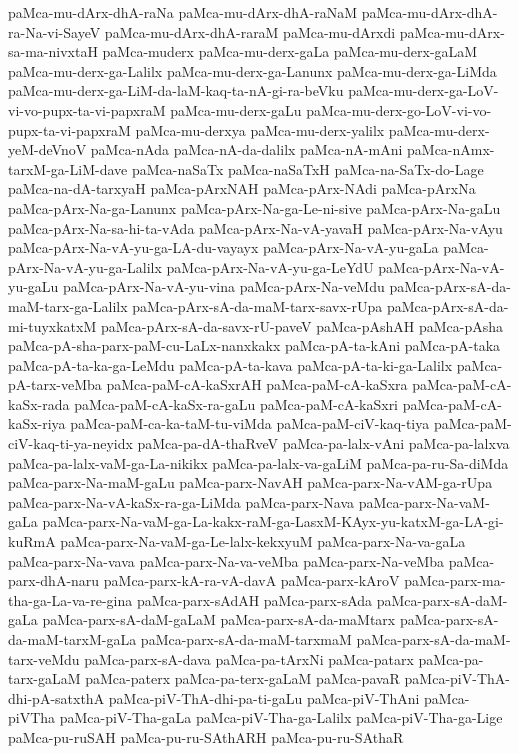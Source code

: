 {paMca-mu-dArx-dhA-raNa
paMca-mu-dArx-dhA-raNaM
paMca-mu-dArx-dhA-ra-Na-vi-SayeV
paMca-mu-dArx-dhA-raraM
paMca-mu-dArxdi
paMca-mu-dArx-sa-ma-nivxtaH
paMca-muderx
paMca-mu-derx-gaLa
paMca-mu-derx-gaLaM
paMca-mu-derx-ga-Lalilx
paMca-mu-derx-ga-Lanunx
paMca-mu-derx-ga-LiMda
paMca-mu-derx-ga-LiM-da-laM-kaq-ta-nA-gi-ra-beVku
paMca-mu-derx-ga-LoV-vi-vo-pupx-ta-vi-papxraM
paMca-mu-derx-gaLu
paMca-mu-derx-go-LoV-vi-vo-pupx-ta-vi-papxraM
paMca-mu-derxya
paMca-mu-derx-yalilx
paMca-mu-derx-yeM-deVnoV
paMca-nAda
paMca-nA-da-dalilx
paMca-nA-mAni
paMca-nAmx-tarxM-ga-LiM-dave
paMca-naSaTx
paMca-naSaTxH
paMca-na-SaTx-do-Lage
paMca-na-dA-tarxyaH
paMca-pArxNAH
paMca-pArx-NAdi
paMca-pArxNa
paMca-pArx-Na-ga-Lanunx
paMca-pArx-Na-ga-Le-ni-sive
paMca-pArx-Na-gaLu
paMca-pArx-Na-sa-hi-ta-vAda
paMca-pArx-Na-vA-yavaH
paMca-pArx-Na-vAyu
paMca-pArx-Na-vA-yu-ga-LA-du-vayayx
paMca-pArx-Na-vA-yu-gaLa
paMca-pArx-Na-vA-yu-ga-Lalilx
paMca-pArx-Na-vA-yu-ga-LeYdU
paMca-pArx-Na-vA-yu-gaLu
paMca-pArx-Na-vA-yu-vina
paMca-pArx-Na-veMdu
paMca-pArx-sA-da-maM-tarx-ga-Lalilx
paMca-pArx-sA-da-maM-tarx-savx-rUpa
paMca-pArx-sA-da-mi-tuyxkatxM
paMca-pArx-sA-da-savx-rU-paveV
paMca-pAshAH
paMca-pAsha
paMca-pA-sha-parx-paM-cu-LaLx-nanxkakx
paMca-pA-ta-kAni
paMca-pA-taka
paMca-pA-ta-ka-ga-LeMdu
paMca-pA-ta-kava
paMca-pA-ta-ki-ga-Lalilx
paMca-pA-tarx-veMba
paMca-paM-cA-kaSxrAH
paMca-paM-cA-kaSxra
paMca-paM-cA-kaSx-rada
paMca-paM-cA-kaSx-ra-gaLu
paMca-paM-cA-kaSxri
paMca-paM-cA-kaSx-riya
paMca-paM-ca-ka-taM-tu-viMda
paMca-paM-ciV-kaq-tiya
paMca-paM-ciV-kaq-ti-ya-neyidx
paMca-pa-dA-thaRveV
paMca-pa-lalx-vAni
paMca-pa-lalxva
paMca-pa-lalx-vaM-ga-La-nikikx
paMca-pa-lalx-va-gaLiM
paMca-pa-ru-Sa-diMda
paMca-parx-Na-maM-gaLu
paMca-parx-NavAH
paMca-parx-Na-vAM-ga-rUpa
paMca-parx-Na-vA-kaSx-ra-ga-LiMda
paMca-parx-Nava
paMca-parx-Na-vaM-gaLa
paMca-parx-Na-vaM-ga-La-kakx-raM-ga-LasxM-KAyx-yu-katxM-ga-LA-gi-kuRmA
paMca-parx-Na-vaM-ga-Le-lalx-kekxyuM
paMca-parx-Na-va-gaLa
paMca-parx-Na-vava
paMca-parx-Na-va-veMba
paMca-parx-Na-veMba
paMca-parx-dhA-naru
paMca-parx-kA-ra-vA-davA
paMca-parx-kAroV
paMca-parx-ma-tha-ga-La-va-re-gina
paMca-parx-sAdAH
paMca-parx-sAda
paMca-parx-sA-daM-gaLa
paMca-parx-sA-daM-gaLaM
paMca-parx-sA-da-maMtarx
paMca-parx-sA-da-maM-tarxM-gaLa
paMca-parx-sA-da-maM-tarxmaM
paMca-parx-sA-da-maM-tarx-veMdu
paMca-parx-sA-dava
paMca-pa-tArxNi
paMca-patarx
paMca-pa-tarx-gaLaM
paMca-paterx
paMca-pa-terx-gaLaM
paMca-pavaR
paMca-piV-ThA-dhi-pA-satxthA
paMca-piV-ThA-dhi-pa-ti-gaLu
paMca-piV-ThAni
paMca-piVTha
paMca-piV-Tha-gaLa
paMca-piV-Tha-ga-Lalilx
paMca-piV-Tha-ga-Lige
paMca-pu-ruSAH
paMca-pu-ru-SAthARH
paMca-pu-ru-SAthaR
}
